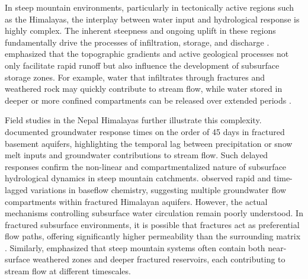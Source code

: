 \documentclass[hess, manuscript]{copernicus}
\begin{document}
In steep mountain environments, particularly in tectonically active regions such as the Himalayas, the interplay between water input and hydrological response is highly complex. The inherent steepness and ongoing uplift in these regions fundamentally drive the processes of infiltration, storage, and discharge \citep{montgomery-2003}. \cite{clarke-2011} emphasized that the topographic gradients and active geological processes not only facilitate rapid runoff but also influence the development of subsurface storage zones. For example, water that infiltrates through fractures and weathered rock may quickly contribute to stream flow, while water stored in deeper or more confined compartments can be released over extended periods \citep{beven-2012}.

Field studies in the Nepal Himalayas further illustrate this complexity. \cite{andermann-etal-2012} documented groundwater response times on the order of 45 days in fractured basement aquifers, highlighting the temporal lag between precipitation or snow melt inputs and groundwater contributions to stream flow. Such delayed responses confirm the non-linear and compartmentalized nature of subsurface hydrological dynamics in steep mountain catchments. \cite{chatton-2017} observed rapid and time-lagged variations in baseflow chemistry, suggesting multiple groundwater flow compartments within fractured Himalayan aquifers. However, the actual mechanisms controlling subsurface water circulation remain poorly understood. In fractured subsurface environments, it is possible that fractures act as preferential flow paths, offering significantly higher permeability than the surrounding matrix \citep{rempe-2018}. Similarly, \cite{somers-2020} emphasized that steep mountain systems often contain both near-surface weathered zones and deeper fractured reservoirs, each contributing to stream flow at different timescales.
\end{document}
